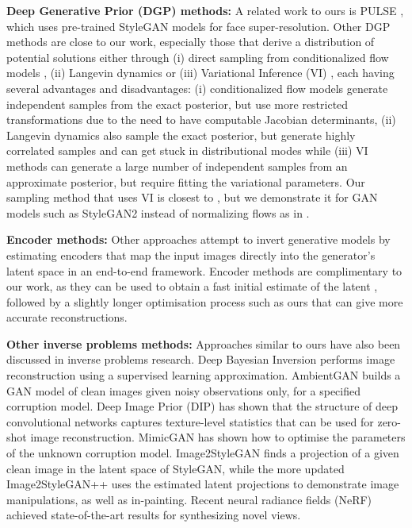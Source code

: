 \documentclass{article}
\newcommand{\pulse}{PULSE \cite{menon2020pulse}}
\begin{document}
\textbf{Deep Generative Prior (DGP) methods:} A related work to ours is \pulse, which uses pre-trained StyleGAN models for face super-resolution. Other DGP methods \cite{bora2017compressed,pan2020exploiting,asim2020invertible,hand2018phase,kelkar2021prior} 
 are close to our work, especially those that derive a distribution of potential solutions either through (i) direct sampling from conditionalized flow models \cite{lugmayr2020srflow}, (ii) Langevin dynamics \cite{jalal2021robust,jalal2021instance} or (iii) Variational Inference (VI) \cite{whang2021composing}, each having several advantages and disadvantages: (i) conditionalized flow models generate independent samples from the exact posterior, but use more restricted transformations due to the need to have computable Jacobian determinants, (ii) Langevin dynamics also sample the exact posterior, but generate highly correlated samples and can get stuck in distributional modes while (iii) VI methods can generate a large number of independent samples from an approximate posterior, but require fitting the variational parameters. Our sampling method that uses VI is closest to \cite{whang2021composing}, but we demonstrate it for GAN models such as StyleGAN2 instead of normalizing flows as in \cite{whang2021composing}.

\textbf{Encoder methods:} Other approaches attempt to invert generative models by estimating encoders that map the input images directly into the generator's latent space \cite{richardson2020encoding} in an end-to-end framework. Encoder methods are complimentary to our work, as they can be used to obtain a fast initial estimate of the latent , followed by a slightly longer optimisation process such as ours that can give more accurate reconstructions.


\textbf{Other inverse problems methods:} Approaches similar to ours have also been discussed in inverse problems research. Deep Bayesian Inversion \cite{adler2018deep} performs image reconstruction using a supervised learning approximation. AmbientGAN \cite{bora2018ambientgan} builds a GAN model of clean images given noisy observations only, for a specified corruption model. Deep Image Prior (DIP) \cite{ulyanov2018deep} has shown that the structure of deep convolutional networks captures texture-level statistics that can be used for zero-shot image reconstruction. MimicGAN \cite{anirudh2020mimicgan} has shown how to optimise the parameters of the unknown corruption model. Image2StyleGAN \cite{abdal2019image2stylegan} finds a projection of a given clean image in the latent space of StyleGAN, while the more updated Image2StyleGAN++ \cite{abdal2020image2stylegan} uses the estimated latent projections to demonstrate image manipulations, as well as in-painting. Recent neural radiance fields (NeRF) \cite{mildenhall2020nerf} achieved state-of-the-art results for synthesizing novel views. 
\end{document}
